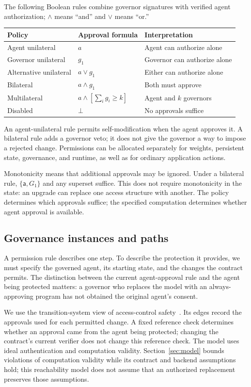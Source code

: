 \documentclass[10pt,letterpaper]{article}
\begin{document}
The following Boolean rules combine governor signatures with verified agent authorization; $\land$ means ``and'' and $\lor$ means ``or.''
\begin{center}
\begin{tabular}{lll}
\toprule
Policy & Approval formula & Interpretation\\
\midrule
Agent unilateral & $a$ & Agent can authorize alone\\
Governor unilateral & $g_1$ & Governor can authorize alone\\
Alternative unilateral & $a\lor g_1$ & Either can authorize alone\\
Bilateral & $a\land g_1$ & Both must approve\\
Multilateral & $a\land[\sum_i g_i\geq k]$ & Agent and $k$ governors\\
Disabled & $\bot$ & No approvals suffice\\
\bottomrule
\end{tabular}
\end{center}
An agent-unilateral rule permits self-modification when the agent approves it. A bilateral rule adds a governor veto; it does not give the governor a way to impose a rejected change. Permissions can be allocated separately for weights, persistent state, governance, and runtime, as well as for ordinary application actions.

Monotonicity means that additional approvals may be ignored. Under a bilateral rule, $\{\mathsf a,G_1\}$ and any superset suffice. This does not require monotonicity in the state: an upgrade can replace one access structure with another. The policy determines which approvals suffice; the specified computation determines whether agent approval is available.

\subsection{Governance instances and paths}
A permission rule describes one step. To describe the protection it provides, we must specify the governed agent, its starting state, and the changes the contract permits. The distinction between the current agent-approval rule and the agent being protected matters: a governor who replaces the model with an always-approving program has not obtained the original agent's consent.

We use the transition-system view of access-control safety~\citep{hru1976}. Its edges record the approvals used for each permitted change. A fixed reference check determines whether an approval came from the agent being protected; changing the contract's current verifier does not change this reference check. The model uses ideal authentication and computation validity. Section~\ref{sec:model} bounds violations of computation validity while its contract and backend assumptions hold; this reachability model does not assume that an authorized replacement preserves those assumptions.
\end{document}
